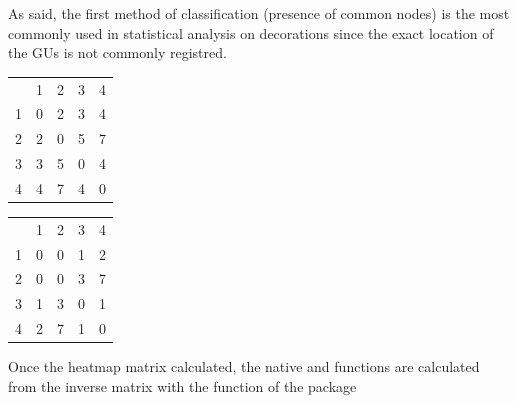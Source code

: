 \documentclass[article]{jss}\usepackage[]{graphicx}\usepackage[]{color}
\begin{document}
As said, the first method of classification (presence of common nodes) is the most commonly used in statistical analysis on decorations since the exact location of the GUs is not commonly registred.

\begin{table}[htb]
\begin{minipage}{.45\textwidth}
\centering
\begin{tabular}{rrrrr}
  & 1 & 2 & 3 & 4 \\ 
 1 & 0 & 2 & 3 & 4 \\ 
  2 & 2 & 0 & 5 & 7 \\ 
  3 & 3 & 5 & 0 & 4 \\ 
  4 & 4 & 7 & 4 & 0 \\ 
  \end{tabular}

\end{minipage}
\begin{minipage}{.45\textwidth}
\centering
\begin{tabular}{rrrrr}
  & 1 & 2 & 3 & 4 \\ 
 1 & 0 & 0 & 1 & 2 \\ 
  2 & 0 & 0 & 3 & 7 \\ 
  3 & 1 & 3 & 0 & 1 \\ 
  4 & 2 & 7 & 1 & 0 \\ 
  \end{tabular}

\end{minipage}
\end{table}

Once the heatmap matrix calculated, the native  and  functions \citep{R19} are calculated from the inverse matrix with the function  of the  package \citep{Friendly20} 
\end{document}
